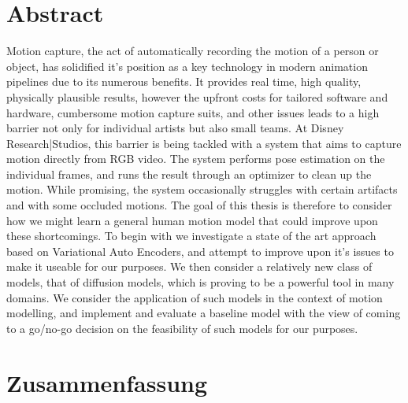 \chapter*{Abstract}

Motion capture, the act of automatically recording the motion of a person or object, has solidified it's position as a key technology in modern animation pipelines due to its numerous benefits. It provides real time, high quality, physically plausible results, however the upfront costs for tailored software and hardware, cumbersome motion capture suits, and other issues leads to a high barrier not only for individual artists but also small teams. At Disney Research|Studios, this barrier is being tackled with a system that aims to capture motion directly from RGB video. The system performs pose estimation on the individual frames, and runs the result through an optimizer to clean up the motion. While promising, the system occasionally struggles with certain artifacts and with some occluded motions. The goal of this thesis is therefore to consider how we might learn a general human motion model that could improve upon these shortcomings. To begin with we investigate a state of the art approach based on Variational Auto Encoders, and attempt to improve upon it's issues to make it useable for our purposes. We then consider a relatively new class of models, that of diffusion models, which is proving to be a powerful tool in many domains. We consider the application of such models in the context of motion modelling, and implement and evaluate a baseline model with the view of coming to a go/no-go decision on the feasibility of such models for our purposes.
 
\cleardoublepage
\chapter*{Zusammenfassung}

